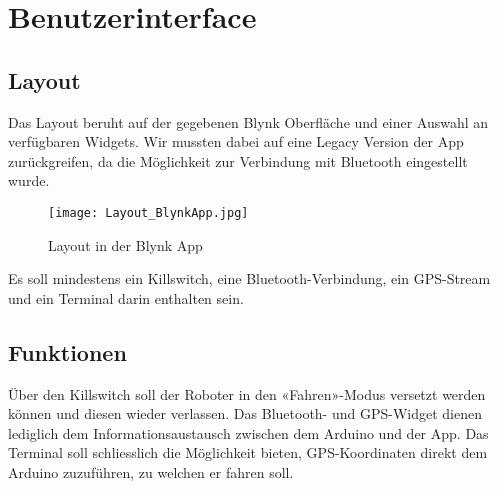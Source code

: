 \section{Benutzerinterface}

\subsection{Layout}
Das Layout beruht auf der gegebenen Blynk Oberfläche und einer Auswahl an verfügbaren Widgets. Wir mussten dabei auf eine Legacy Version der App zurückgreifen, da die Möglichkeit zur Verbindung mit Bluetooth eingestellt wurde.

\begin{figure}[H]
    \begin{center}
    \texttt{[image: Layout\_BlynkApp.jpg]}
    \end{center}
    \caption{Layout in der Blynk App}
\end{figure}

Es soll mindestens ein Killswitch, eine Bluetooth-Verbindung, ein GPS-Stream und ein Terminal darin enthalten sein.

\subsection{Funktionen}
Über den Killswitch soll der Roboter in den «Fahren»-Modus versetzt werden können und diesen wieder verlassen. Das Bluetooth- und GPS-Widget dienen lediglich dem Informationsaustausch zwischen dem Arduino und der App. Das Terminal soll schliesslich die Möglichkeit bieten, GPS-Koordinaten direkt dem Arduino zuzuführen, zu welchen er fahren soll.